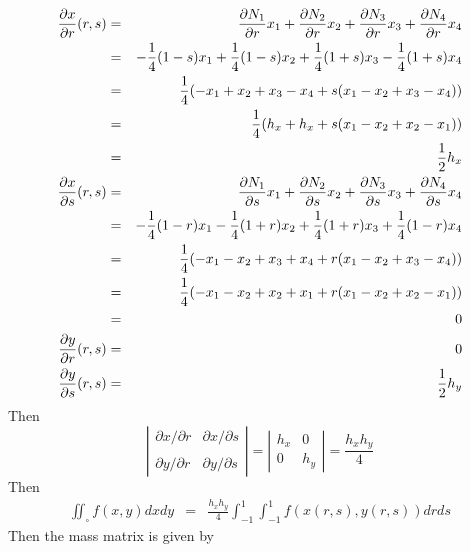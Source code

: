 \begin{eqnarray}
\frac{\partial x}{\partial r}(r,s)
&=&\frac{\partial N_1}{\partial r} x_1+\frac{\partial N_2}{\partial r} x_2
+\frac{\partial N_3}{\partial r} x_3+\frac{\partial N_4}{\partial r} x_4 \nonumber\\
&=& -\frac{1}{4}(1-s) x_1 + \frac{1}{4}(1-s) x_2 + \frac{1}{4}(1+s) x_3 - \frac{1}{4}(1+s) x_4 \nonumber\\
&=& \frac{1}{4} ( -x_1 +x_2 +x_3 -x_4  +s (x_1 -x_2 +x_3 -x_4)   )  \nonumber\\
&=& \frac{1}{4} ( h_x+h_x  +s (x_1 -x_2 +x_2 -x_1)   )  \nonumber\\
&=& \frac{1}{2} h_x \nonumber\\
\frac{\partial x}{\partial s}(r,s)
&=&\frac{\partial N_1}{\partial s} x_1+\frac{\partial N_2}{\partial s} x_2
+\frac{\partial N_3}{\partial s} x_3+\frac{\partial N_4}{\partial s} x_4 \nonumber\\
&=& -\frac{1}{4}(1-r)x_1 - \frac{1}{4}(1+r)x_2 +\frac{1}{4}(1+r)x_3 +\frac{1}{4}(1-r)x_4 \nonumber\\
&=& \frac{1}{4} ( -x_1 -x_2 +x_3+x_4 + r(x_1-x_2+x_3-x_4) ) \nonumber\\ 
&=& \frac{1}{4} ( -x_1 -x_2 +x_2+x_1 + r(x_1-x_2+x_2-x_1) ) \nonumber\\
&=& 0 \nonumber\\ 
\frac{\partial y}{\partial r}(r,s)
&=& 0 \nonumber\\
\frac{\partial y}{\partial s}(r,s)
&=& \frac{1}{2} h_y
\end{eqnarray}
Then 
\[
\left| 
\begin{array}{cc}
\partial x/\partial r & \partial x/\partial s \\ \\
\partial y/\partial r & \partial y/\partial s 
\end{array}
\right|  
=
\left| 
\begin{array}{cc}
h_x & 0 \\
0 & h_y 
\end{array}
\right|  
= \frac{h_xh_y}{4}
\]
Then 
\begin{eqnarray}
\iint_\square f(x,y) dx dy &=&  \frac{h_xh_y}{4} \int_{-1}^{1} \int_{-1}^{1} f(x(r,s),y(r,s)) dr ds
\end{eqnarray}
Then the mass matrix is given by
